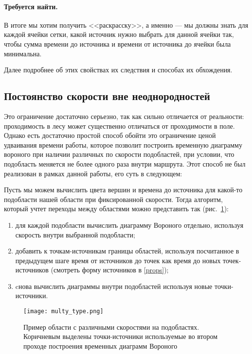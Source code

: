 \documentclass[12pt]{article}
\begin{document}
\paragraph{Требуется найти.}
В итоге мы хотим получить <<раскрасску>>, а именно --- мы должны знать для
каждой ячейки сетки, какой источник нужно выбрать для данной ячейки так, 
чтобы сумма времени до источника и времени от источника до ячейки была 
минимальна.

Далее подробнее об этих свойствах их следствия и способах их обхождения.

\subsection{Постоянство скорости вне неоднородностей}
\label{multi_type}
Это ограничение достаточно серьезно, так как сильно отличается от реальности:
проходимость в лесу может существенно отличаться от проходимости в поле. 
Однако есть достаточно простой способ обойти это ограничение ценой удваивания
времени работы, которое позволит построить временную диаграмму вороного при
наличии различных по скорости подобластей, при условии, что подобласть меняется
не более одного раза внутри маршрута. Этот способ не был реализован в рамках 
данной работы, его суть в следующем:

Пусть мы можем вычислить цвета вершин и времена до источника для какой-то 
подобласти нашей области при фиксированной скорости. Тогда алгоритм, который
учтет переходы между областями можно представить так (рис.~\ref{multi_type_fig}):
\begin{enumerate}
\item для каждой подобласти вычислить диаграмму Вороного отдельно, используя
скорость внутри выбранной подобласти;
\item добавить к точкам-источникам границы областей, используя посчитанное в
предыдущем шаге время от источников до точек как время до новых 
точек-источников (смотреть форму источников в \ref{props});
\item cнова вычислить диаграммы внутри подобластей используя новые
точки-источники.
\end{enumerate}
\begin{figure}
\center\texttt{[image: multy\_type.png]}
\caption{Пример области с различными скоростями на подобластях. Коричневым
выделены точки-источники используемые во втором проходе построения временных
диаграмм Вороного}
\label{multi_type_fig}
\end{figure}
\end{document}
